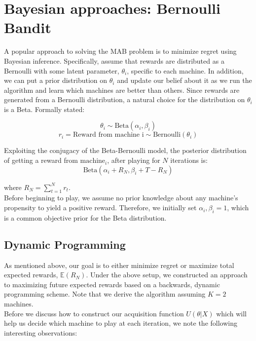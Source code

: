 \documentclass{article}
\begin{document}
\section{Bayesian approaches: Bernoulli Bandit}

A popular approach to solving the MAB problem is to minimize regret using Bayesian inference. Specifically, assume that rewards are distributed as a Bernoulli with some latent parameter, $\theta_i$, specific to each machine. In addition, we can put a prior distribution on $\theta_i$ and update our belief about it as we run the algorithm and learn which machines are better than others. Since rewards are generated from a Bernoulli distribution, a natural choice for the distribution on $\theta_i$ is a Beta. Formally stated:

$$\theta_i \sim \text{Beta}(\alpha_i, \beta_i)$$
$$r_i = \text{Reward from machine i} \sim \text{Bernoulli}(\theta_i)$$

Exploiting the conjugacy of the Beta-Bernoulli model, the posterior distribution of getting a reward from $\text{machine}_i$, after playing for $N$ iterations is:
$$\text{Beta}(\alpha_i + R_{N}, \beta_i + T - R_{N})$$

where $R_{N} = \sum_{t=1}^{N}r_{t}$.\\

Before beginning to play, we assume no prior knowledge about any machine's propensity to yield a positive reward. Therefore, we initially set $\alpha_i, \beta_i = 1$, which is a common objective prior for the Beta distribution.\\

\subsection{Dynamic Programming}

As mentioned above, our goal is to either minimize regret or maximize total expected rewards, $\mathbb{E}(R_N)$. Under the above setup, we constructed an approach to maximizing future expected rewards based on a backwards, dynamic programming scheme. Note that we derive the algorithm assuming $K = 2$ machines.\\

Before we discuss how to construct our acquisition function $U(\theta|X)$ which will help us decide which machine to play at each iteration, we note the following interesting observations:
\end{document}
